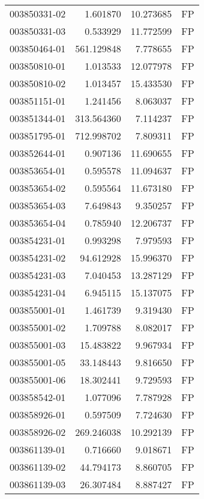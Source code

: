 \begin{tabular}{lrrl}
003850331-02 &    1.601870 &      10.273685 &   FP \\
003850331-03 &    0.533929 &      11.772599 &   FP \\
003850464-01 &  561.129848 &       7.778655 &   FP \\
003850810-01 &    1.013533 &      12.077978 &   FP \\
003850810-02 &    1.013457 &      15.433530 &   FP \\
003851151-01 &    1.241456 &       8.063037 &   FP \\
003851344-01 &  313.564360 &       7.114237 &   FP \\
003851795-01 &  712.998702 &       7.809311 &   FP \\
003852644-01 &    0.907136 &      11.690655 &   FP \\
003853654-01 &    0.595578 &      11.094637 &   FP \\
003853654-02 &    0.595564 &      11.673180 &   FP \\
003853654-03 &    7.649843 &       9.350257 &   FP \\
003853654-04 &    0.785940 &      12.206737 &   FP \\
003854231-01 &    0.993298 &       7.979593 &   FP \\
003854231-02 &   94.612928 &      15.996370 &   FP \\
003854231-03 &    7.040453 &      13.287129 &   FP \\
003854231-04 &    6.945115 &      15.137075 &   FP \\
003855001-01 &    1.461739 &       9.319430 &   FP \\
003855001-02 &    1.709788 &       8.082017 &   FP \\
003855001-03 &   15.483822 &       9.967934 &   FP \\
003855001-05 &   33.148443 &       9.816650 &   FP \\
003855001-06 &   18.302441 &       9.729593 &   FP \\
003858542-01 &    1.077096 &       7.787928 &   FP \\
003858926-01 &    0.597509 &       7.724630 &   FP \\
003858926-02 &  269.246038 &      10.292139 &   FP \\
003861139-01 &    0.716660 &       9.018671 &   FP \\
003861139-02 &   44.794173 &       8.860705 &   FP \\
003861139-03 &   26.307484 &       8.887427 &   FP \\

\end{tabular}
